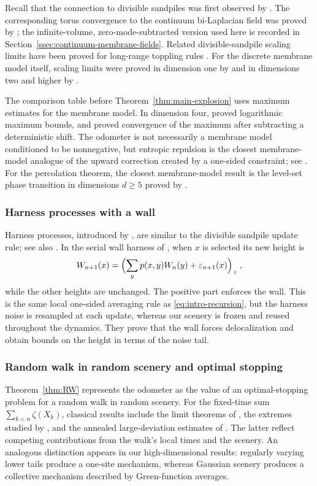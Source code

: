 \documentclass[11pt]{amsart}
\theoremstyle{plain}
\theoremstyle{definition}
\begin{document}
Recall that the connection to divisible sandpiles was first observed by
\citet*{LMPU}. The corresponding torus convergence to the continuum
bi-Laplacian field was proved by \citet*[Theorem~2]{CHR}; the
infinite-volume, zero-mode-subtracted version used here is recorded in
Section~\ref{ssec:continuum-membrane-fields}.
Related divisible-sandpile scaling limits have been proved for long-range toppling rules
\citep{FroJar,CJR}. For the discrete
membrane model itself, scaling limits were proved in dimension one by
\citet*{CaravennaDeuschel} and in dimensions two and higher by
\citet*[Theorems~2.1 and~3.11]{CDH}.

The comparison table before Theorem~\ref{thm:main-explosion} uses maximum
estimates for the membrane model. In dimension four, \citet*{Kurt09} proved
logarithmic maximum bounds, and \citet*{Schweiger20} proved convergence of the
maximum after subtracting a deterministic shift. The odometer is not necessarily
a membrane model conditioned to be nonnegative, but entropic repulsion is
the closest membrane-model analogue of the upward correction created by a
one-sided constraint; see \citet*{Kurt,Kurt09}. For the percolation theorem,
the closest membrane-model result is the level-set phase transition in
dimensions $d\geq5$ proved by \citet*{ChiariniNitzschner}.

\subsubsection{Harness processes with a wall}

Harness processes, introduced by \citet*{HammersleyHarnesses}, are similar to the divisible sandpile 
update rule; see also
\citet*{ToomHarness,FerrariNiederhauserHarness}. In the serial wall harness
of \citet*{FerrariFontesNiederhauserVachkovskaiaWall}, when $x$ is selected
its new height is
\[
    W_{n+1}(x)=\Bigl(\sum_y p(x,y)W_n(y)+\varepsilon_{n+1}(x)\Bigr)_+\, ,
\]
while the other heights are unchanged. The positive part enforces the wall.
This is the same local one-sided averaging rule as
\eqref{eq:intro-recursion}, but the harness noise is resampled at each update,
whereas our scenery is frozen and reused throughout the dynamics. They prove
that the wall forces delocalization and obtain bounds on the height in terms
of the noise tail.

\subsubsection{Random walk in random scenery and optimal stopping}
Theorem~\ref{thm:RW} represents the odometer as the value of an
optimal-stopping problem for a random walk in random scenery. For the
fixed-time sum $\sum_{k<n}\zeta(X_k)$, classical results include the limit
theorems of \citet*{KesSpi,Bolt}, the extremes studied by
\citet*{FrankeSaigoExtremes}, and the annealed large-deviation estimates of
\citet*{GKS,GantertHofstadKonig}. The latter reflect competing contributions
from the walk's local times and the scenery. An analogous distinction appears
in our high-dimensional results: regularly varying lower tails produce a
one-site mechanism, whereas Gaussian scenery produces a collective
mechanism described by Green-function averages.
\end{document}
